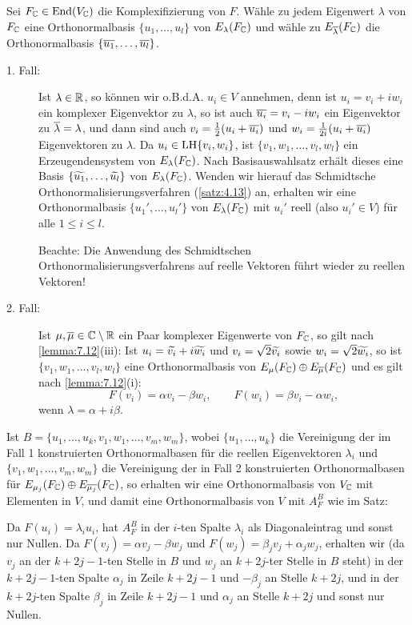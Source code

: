 \begin{beweis}
	Sei $F_{\mathbb{C}} \in \operatorname{End}(V_{\mathbb{C}})$ die Komplexifizierung von $F$.
	Wähle zu jedem Eigenwert $\lambda$ von $F_{\mathbb{C}}$ eine Orthonormalbasis $\{u_1,\dots,u_l\}$ von $E_{\lambda}(F_{\mathbb{C}})$ und wähle zu $E_{\overline{\lambda}}(F_{\mathbb{C}})$ die Orthonormalbasis $\{\overline{u_1},\dots,\overline{u_l}\}$.
	\begin{description}
		\item[1. Fall:] Ist $\lambda \in \mathbb{R}$, so können wir o.B.d.A. $u_i \in V$ annehmen, denn ist $u_i = v_i + iw_i$ ein komplexer Eigenvektor zu $\lambda$, so ist auch $\overline{u_i} = v_i - iw_i$ ein Eigenvektor zu $\overline{\lambda} = \lambda$, und dann sind auch $v_i = \frac{1}{2}(u_i + \overline{u_i})$ und $w_i = \frac{1}{2i}(u_i + \overline{u_i})$ Eigenvektoren zu $\lambda$.
		Da $u_i \in \operatorname{LH}\{v_i,w_i\}$, ist $\{v_1,w_1,\dots, v_l,w_l\}$ ein Erzeugendensystem von $E_{\lambda}(F_{\mathbb{C}})$.
		Nach Basisauswahlsatz erhält dieses eine Basis $\{\widetilde{u_1},\dots,\widetilde{u_l}\}$ von $E_{\lambda}(F_{\mathbb{C}})$.
		Wenden wir hierauf das Schmidtsche Orthonormalisierungsverfahren (\autoref{satz:4.13}) an, erhalten wir eine Orthonormalbasis $\{u_1',\dots,u_l'\}$ von $E_\lambda(F_{\mathbb{C}})$ mit $u_i'$ reell (also $u_i' \in V$) für alle $1 \leq i \leq l$.
		
		Beachte: Die Anwendung des Schmidtschen Orthonormalisierungsverfahrens auf reelle Vektoren führt wieder zu reellen Vektoren!
		\item[2. Fall:] Ist $\mu, \overline{\mu} \in \mathbb{C} \setminus \mathbb{R}$ ein Paar komplexer Eigenwerte von $F_{\mathbb{C}}$, so gilt nach \autoref{lemma:7.12}(iii):
		Ist $u_i = \widetilde{v_i} + i \widetilde{w_i}$ und $v_i = \sqrt{2} \widetilde{v_i}$ sowie $w_i = \sqrt{2} \widetilde{w_i}$, so ist $\{v_1,w_1,\dots,v_l,w_l\}$ eine Orthonormalbasis von $E_\mu(F_{\mathbb{C}}) \oplus E_{\overline{\mu}}(F_{\mathbb{C}})$ und es gilt nach \autoref{lemma:7.12}(i): 
		\[
			F(v_i) = \alpha v_i - \beta w_i, \qquad F(w_i) = \beta v_i - \alpha w_i,
		\]
		wenn $\lambda = \alpha + i \beta$.
	\end{description}
	Ist $B = \{u_1,\dots,u_k,v_1,w_1,\dots,v_m,w_m\}$, wobei $\{u_1,\dots,u_k\}$ die Vereinigung der im Fall 1 konstruierten Orthonormalbasen für die reellen Eigenvektoren $\lambda_i$ und $\{v_1,w_1,\dots,v_m,w_m\}$ die Vereinigung der in Fall 2 konstruierten Orthonormalbasen für $E_{\mu_j}(F_{\mathbb{C}}) \oplus E_{\overline{\mu_j}}(F_{\mathbb{C}})$, so erhalten wir eine Orthonormalbasis von $V_{\mathbb{C}}$ mit Elementen in $V$, und damit eine Orthonormalbasis von $V$ mit $A_F^B$ wie im Satz:
		
	Da $F(u_i) = \lambda_i u_i$, hat $A_F^B$ in der $i$-ten Spalte $\lambda_i$ als Diagonaleintrag und sonst nur Nullen.
	Da $F(v_j) = \alpha v_j - \beta w_j$ und $F(w_j) = \beta_j v_j + \alpha_j w_j$, erhalten wir (da $v_j$ an der $k+2j-1$-ten Stelle in $B$ und $w_j$ an $k+2j$-ter Stelle in $B$ steht) in der $k+2j-1$-ten Spalte $\alpha_j$ in Zeile $k+2j-1$ und $-\beta_j$ an Stelle $k+2j$, und in der $k+2j$-ten Spalte $\beta_j$ in Zeile $k+2j-1$ und $\alpha_j$ an Stelle $k+2j$ und sonst nur Nullen. \qedhere	
\end{beweis}

